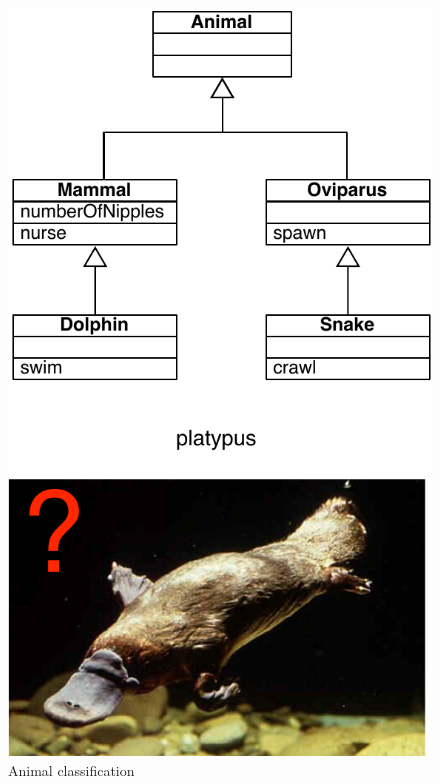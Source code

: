 \documentclass [11pt, a4wide, twoside]{article}
\begin{document}
\begin{enumerate}
\begin{figure}[ht!]
\begin{center}
\includegraphics[width=0.4\columnwidth]{solutions/Ex2.pdf}
\caption{Animal classification}
\label{fig:ex2}
\end{center}
\end{figure}

\solution{}


\end{enumerate}
\end{document}
